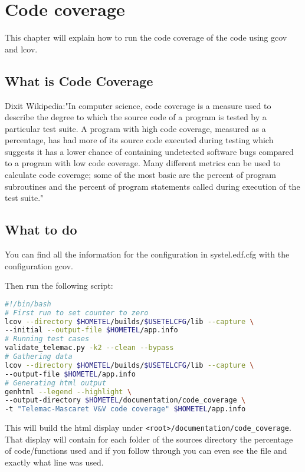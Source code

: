 %
\chapter{Code coverage}
%
This chapter will explain how to run the code coverage of the code using gcov and lcov.
%
%
\section{What is Code Coverage}
%
%
Dixit Wikipedia:"In computer science, code coverage is a measure used to
describe the degree to which the source code of a program is tested by a
particular test suite. A program with high code coverage, measured as a
percentage, has had more of its source code executed during testing which
suggests it has a lower chance of containing undetected software bugs compared
to a program with low code coverage. Many different metrics can be used to
calculate code coverage; some of the most basic are the percent of program
subroutines and the percent of program statements called during execution of
the test suite."
%
%
\section{What to do}
%
%
You can find all the information for the configuration in systel.edf.cfg with
the configuration gcov.

Then run the following script:
\begin{lstlisting}[language=bash]
#!/bin/bash
# First run to set counter to zero
lcov --directory $HOMETEL/builds/$USETELCFG/lib --capture \
--initial --output-file $HOMETEL/app.info
# Running test cases
validate_telemac.py -k2 --clean --bypass
# Gathering data
lcov --directory $HOMETEL/builds/$USETELCFG/lib --capture \
--output-file $HOMETEL/app.info
# Generating html output
genhtml --legend --highlight \
--output-directory $HOMETEL/documentation/code_coverage \
-t "Telemac-Mascaret V&V code coverage" $HOMETEL/app.info
\end{lstlisting}

This will build the html display under
\verb!<root>/documentation/code_coverage!. That display will contain for each
folder of the sources directory the percentage of code/functions used and if
you follow through you can even see the file and exactly what line was used.

